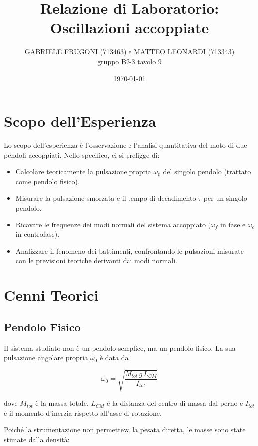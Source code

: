 \documentclass[a4paper,12pt]{article}
\title{Relazione di Laboratorio: Oscillazioni accoppiate}       %
\author{GABRIELE FRUGONI (713463) e MATTEO LEONARDI (713343)\\ gruppo B2-3 tavolo 9}
\date{\today}
\begin{document}
\maketitle

\section{Scopo dell'Esperienza}

Lo scopo dell'esperienza è l'osservazione e l'analisi quantitativa del moto di due pendoli accoppiati. Nello specifico, ci si prefigge di:

\begin{itemize}
    \item Calcolare teoricamente la pulsazione propria $\omega_0$ del singolo pendolo (trattato come pendolo fisico).
    \item Misurare la pulsazione smorzata e il tempo di decadimento $\tau$ per un singolo pendolo.
    \item Ricavare le frequenze dei modi normali del sistema accoppiato ($\omega_f$ in fase e $\omega_c$ in controfase).
    \item Analizzare il fenomeno dei battimenti, confrontando le pulsazioni misurate con le previsioni teoriche derivanti dai modi normali.
\end{itemize}

\section{Cenni Teorici}

\subsection{Pendolo Fisico}

Il sistema studiato non è un pendolo semplice, ma un pendolo fisico. La sua pulsazione angolare propria $\omega_0$ è data da:

\begin{equation}
    \omega_0 = \sqrt{\frac{M_{tot} \, g \, L_{CM}}{I_{tot}}}
    \label{eq:pulsazione_angolare}
\end{equation}

dove $M_{tot}$ è la massa totale, $L_{CM}$ è la distanza del centro di massa dal perno e $I_{tot}$ è il momento d'inerzia rispetto all'asse di rotazione.

Poiché la strumentazione non permetteva la pesata diretta, le masse sono state stimate dalla densità:
\end{document}
